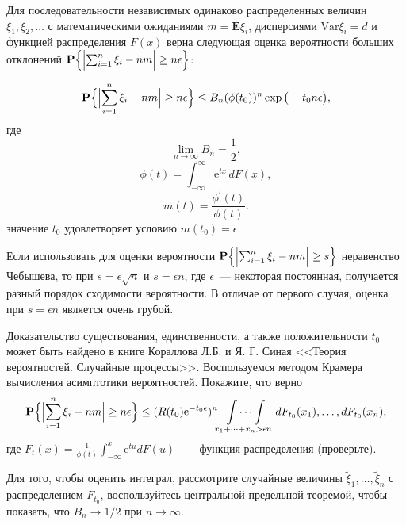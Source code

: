\begin{problem}
Для последовательности независимых одинаково распределенных величин $\xi_1,\xi_2,\dots$ с математическими ожиданиями $m = \mathbf{E} \xi_i$, дисперсиями $\text{Var} \xi_i = d$ и функцией распределения $F(x)$ верна следующая оценка вероятности больших отклонений $\mathbf{P}\Bigl\{\Bigl|\sum_{i=1}^n\xi_i -n m \Bigr|\geq n\epsilon \Bigr\}$: 

\begin{equation*}
\mathbf{P}\Bigl\{\Bigl|\sum_{i=1}^n \xi_i -n m \Bigr|\geq n\epsilon \Bigr\} \leq B_n(\phi(t_0))^n \exp\big(-t_0 n\epsilon \bigr) ,
\end{equation*}
где 
\begin{equation*}
\lim_{n\to\infty}B_n=\frac{1}{2},
\end{equation*}
\begin{equation*}
\phi(t)=\int_{-\infty}^{\infty}\text{e}^{t x}\,d F(x),
\end{equation*}
\begin{equation*}
m(t) = \frac{\phi^{\prime}(t)}{\phi(t)}.
\end{equation*}
значение $t_0$ удовлетворяет условию  $m(t_0) = \epsilon$.
\end{problem}
\begin{remark}


Если использовать для оценки вероятности $\mathbf{P}\Bigl\{\Bigl|\sum_{i=1}^n\xi_i - n m\Bigr|\geq s\Bigr\}$ неравенство Чебышева, то при $s = \epsilon \sqrt{n}$ и $s=\epsilon n$, где $\epsilon$~--- некоторая постоянная, получается разный порядок сходимости вероятности. В отличае от первого случая, оценка при $s=\epsilon n$ является очень грубой. 

Доказательство существования, единственности, а также положительности $t_0$  может быть найдено в книге Кораллова Л.Б. и Я. Г. Синая <<Теория вероятностей. Случайные процессы>>. Воспользуемся методом Крамера вычисления асимптотики вероятностей. Покажите, что верно 
\begin{equation*}
\mathbf{P}\Bigl\{\Bigl|\sum_{i=1}^n \xi_i- n m\Bigr|\geq n \epsilon \Bigr\} \leq (R(t_0)\text{e}^{-t_0\epsilon})^n \idotsint\limits_{x_1+\dots+x_n>\epsilon n} \,dF_{t_0}(x_1),\dots,dF_{t_0}(x_n),
\end{equation*}
где $F_t(x) = \frac{1}{\phi(t)}\int_{-\infty}^{x} \text{e}^{t u}d F(u)$ ~--- функция распределения (проверьте).

Для того, чтобы оценить интеграл, рассмотрите случайные величины $\tilde{\xi}_1,\dots,\tilde{\xi}_n$ с распределением $F_{t_0}$, воспользуйтесь центральной предельной теоремой, чтобы показать, что $B_n\to1/2$ при ${n\to\infty}$.
\end{remark}

